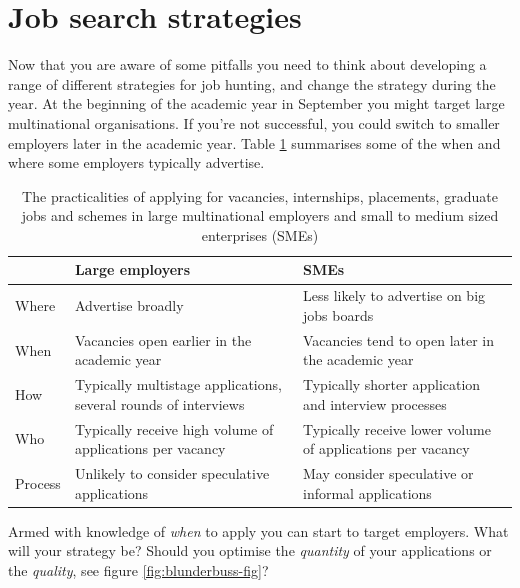 \documentclass[
]{book}
\begin{document}
\hypertarget{strategies}{%
\section{Job search strategies}\label{strategies}}

Now that you are aware of some pitfalls you need to think about developing a range of different strategies for job hunting, and change the strategy during the year. At the beginning of the academic year in September you might target large multinational organisations. If you're not successful, you could switch to smaller employers later in the academic year. Table \ref{tab:shortcuts} summarises some of the when and where some employers typically advertise.

\begin{table}

\caption{\label{tab:shortcuts}The practicalities of applying for vacancies, internships, placements, graduate jobs and schemes in large multinational employers and small to medium sized enterprises (SMEs)}
\centering
\begin{tabular}[t]{lll}
\toprule
 & Large employers & SMEs\\
\midrule
Where & Advertise broadly & Less likely to advertise on big jobs boards\\
When & Vacancies open earlier in the academic year & Vacancies tend to open later in the academic year\\
How & Typically multistage applications, several rounds of interviews & Typically shorter application and interview processes\\
Who & Typically receive high volume of applications per vacancy & Typically receive lower volume of applications per vacancy\\
Process & Unlikely to consider speculative applications & May consider speculative or informal applications\\
\bottomrule
\end{tabular}
\end{table}

Armed with knowledge of \emph{when} to apply you can start to target employers. What will your strategy be? Should you optimise the \emph{quantity} of your applications or the \emph{quality}, see figure \ref{fig:blunderbuss-fig}?
\end{document}
